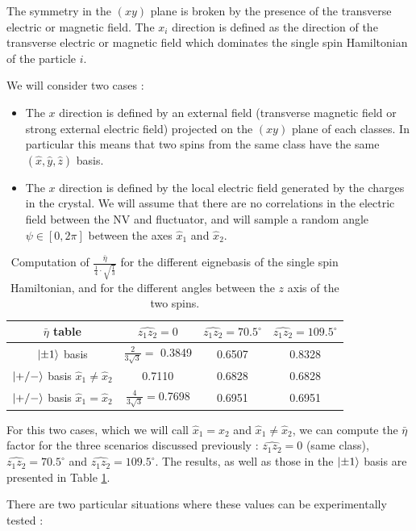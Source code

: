 \documentclass[preprintnumbers,amsmath,amssymb,onecolumn,12pt]{revtex4-2}\usepackage{graphicx}%
\begin{document}
The symmetry in the $(xy)$ plane is broken by the presence of the transverse electric or magnetic field. The $x_i$ direction is defined as the direction of the transverse electric or magnetic field which dominates the single spin Hamiltonian of the particle $i$.

We will consider two cases :
\begin{itemize}
\item The $x$ direction is defined by an external field (transverse magnetic field or strong external electric field) projected on the $(xy)$ plane of each classes. In particular this means that two spins from the same class have the same $(\hat x, \hat y, \hat z)$ basis.
\item The $x$ direction is defined by the local electric field generated by the charges in the crystal. We will assume that there are no correlations in the electric field between the NV and fluctuator, and will sample a random angle $\psi \in [0,2\pi]$ between the axes $\hat{x}_1$ and $\hat{x}_2$.
\end{itemize}

\begin{table}
\begin{tabular}{cccc}
\hline
$\bar{\eta}$ table & $\widehat{z_1 z_2}=0$ & $\widehat{z_1 z_2}=70.5^\circ$ & $\widehat{z_1 z_2}=109.5^\circ$ \\
\hline
$\ket{\pm 1}$ basis & $\frac{2}{3\sqrt{3}}=$ 0.3849 & 0.6507 & 0.8328 \\
$\ket{+/-}$ basis $\hat{x}_1\neq \hat{x}_2$ & 0.7110  & 0.6828 & 0.6828 \\
$\ket{+/-}$ basis $\hat{x}_1= \hat{x}_2$ & $\frac{4}{3\sqrt{3}}=$0.7698  & 0.6951 & 0.6951 \\
\hline
\end{tabular}
\caption{Computation of $\frac{\bar{\eta}}{ \frac{1}{4} \cdot \sqrt{\frac{1}{3}}}$ for the different eignebasis of the single spin Hamiltonian, and for the different angles between the $z$ axis of the two spins.}
\label{table eta}
\end{table}

For this two cases, which we will call $\hat{x}_1=\hat{x}_2$ and $\hat{x}_1\neq \hat{x}_2$, we can compute the $\bar \eta$ factor for the three scenarios discussed previously : $\widehat{z_1 z_2}=0$ (same class), $\widehat{z_1 z_2}=70.5^\circ$ and $\widehat{z_1 z_2}=109.5^\circ$. The results, as well as those in the $\ket{\pm 1}$ basis are presented in Table \ref{table eta}.

There are two particular situations where these values can be experimentally tested :
\end{document}
